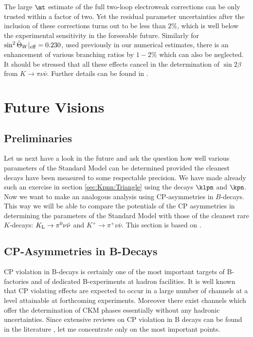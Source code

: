 The
large $\mt$ estimate of the full two-loop electroweak corrections
can be only trusted within a factor of two. Yet the residual parameter
uncertainties after the inclusion of these corrections turns out
to be less than $2\%$, which is well below the experimental
sensitivity in the forseeable future. Similarly for
$\sin^2\hat\Theta_W|_{\rm eff}=0.230$, used previously in our numerical
estimates, there is an enhancement of various branching ratios by
$1-2\%$ which can also be neglected. It should be stressed that all
these effects cancel in the determination of $\sin 2\beta$ from
$K\to\pi\nu\bar\nu$. Further details can be found in \cite{BB97}. 
\section{Future Visions}
\setcounter{equation}{0}
\subsection{Preliminaries}
Let us next have a look in the future and ask the question how well various
parameters of the Standard Model can be determined provided the
cleanest decays  have been measured
to some respectable precision. We have made already such an exercise in
section \ref{sec:Kpnn:Triangle}
using the decays $\klpn$ and $\kpn$. Now we want to make
an analogous analysis using CP-asymmetries in $B$-decays. This way we
will be able to compare the potentials of the CP asymmetries in
determining the parameters of the Standard Model with those
of the cleanest rare $K$-decays: $K_{\rm L}\to\pi^0\nu\bar\nu$ and
$K^+\to\pi^+\nu\bar\nu$. This section is based on 
\cite{BLO,AJB94,BB96,B95}.
\subsection{CP-Asymmetries in B-Decays}
CP violation in B-decays is certainly one of the most important 
targets of B-factories and of dedicated B-experiments at hadron 
facilities. It is well known that CP violating effects are expected
to occur in a large number of channels at a level attainable at 
forthcoming experiments. Moreover there exist channels which
offer the determination of CKM phases essentially without any hadronic
uncertainties. Since extensive reviews on CP violation in B decays can 
be found in the literature \cite{BF97,NQ,RF97}, 
let me concentrate only on the most important points.


